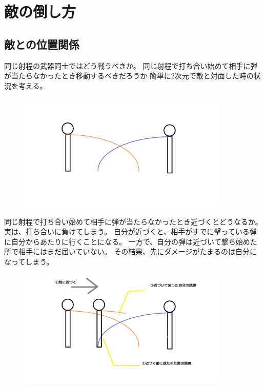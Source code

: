 \documentclass[a4paper,11pt]{jsbook}
\begin{document}
\section{敵の倒し方}
\subsection{敵との位置関係}
同じ射程の武器同士ではどう戦うべきか。
同じ射程で打ち合い始めて相手に弾が当たらなかったとき移動するべきだろうか
簡単に2次元で敵と対面した時の状況を考える。
\begin{figure}
  \begin{center}
    \includegraphics[width=10cm]{resoource/samerange.png}
  \end{center}
\end{figure}

同じ射程で打ち合い始めて相手に弾が当たらなかったとき近づくとどうなるか。
実は、打ち合いに負けてしまう。
自分が近づくと、相手がすでに撃っている弾に自分からあたりに行くことになる。
一方で、自分の弾は近づいて撃ち始めた所で相手にはまだ届いていない。
その結果、先にダメージがたまるのは自分になってしまう。
\begin{figure}
  \begin{center}
    \includegraphics[width=10cm]{resoource/samerange_attacking.png}
  \end{center}
\end{figure}
\end{document}
